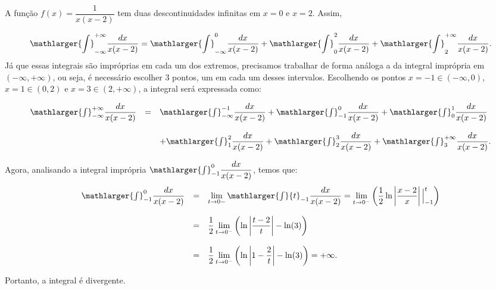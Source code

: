 \cleardoublepage\documentclass[../main.tex]{subfiles}
\begin{document}
\begin{ex}
\begin{compactenum}[a)]
\begin{solution}
A função \(f(x)=\dfrac{1}{x(x-2)}\) tem duas descontinuidades infinitas em \(x=0\) e \(x=2\). Assim,

\[ \mathlarger{\int}^{+\infty}_{-\infty} \dfrac{dx}{x(x-2)}=\mathlarger{\int}^{0}_{-\infty} \dfrac{dx}{x(x-2)} + \mathlarger{\int}^{2}_{0} \dfrac{dx}{x(x-2)} + \mathlarger{\int}^{+\infty}_{2} \dfrac{dx}{x(x-2)}. \]
Já que essas integrais são impróprias em cada um dos extremos, precisamos trabalhar de forma análoga a da integral imprópria em \((-\infty, +\infty)\), ou seja, é necessário escolher 3 pontos, um em cada um desses intervalos. Escolhendo os pontos \(x=-1\in (-\infty, 0)\), \(x=1\in (0,2)\) e \(x=3\in (2, +\infty)\), a integral será expressada como:

\[ \begin{array}{rcl} \mathlarger{\int}^{+\infty}_{-\infty} \dfrac{dx}{x(x-2)}&=&\mathlarger{\int}^{-1}_{-\infty} \dfrac{dx}{x(x-2)} + \mathlarger{\int}^{0}_{-1} \dfrac{dx}{x(x-2)} + \mathlarger{\int}^{1}_{0} \dfrac{dx}{x(x-2)} \\ \\ && + \mathlarger{\int}^{2}_{1} \dfrac{dx}{x(x-2)} + \mathlarger{\int}^{3}_{2} \dfrac{dx}{x(x-2)} + \mathlarger{\int}^{+\infty}_{3} \dfrac{dx}{x(x-2)}. \end{array} \]

Agora, analisando a integral imprópria $\mathlarger{\int}^{0}_{-1} \dfrac{dx}{x(x-2)}$, temos que:
\[ \begin{array}{rcl} \mathlarger{\int}^{0}_{-1} \dfrac{dx}{x(x-2)}& =& \lim\limits_{t \to 0{-}}\mathlarger{\int}{t}_{-1} \dfrac{dx}{x(x-2)} = \lim\limits_{t \to 0^{-}} \left( \dfrac{1}{2} \ln \left|\dfrac{x-2}{x}\right| \Big{|}^{t}_{-1}\right) \\ \\ &=& \dfrac{1}{2}\lim\limits_{t \to 0^{-}} \left( \ln \left|\dfrac{t-2}{t} \right| - \ln (3) \right) \\ \\ &=& \dfrac{1}{2}\lim\limits_{t \to 0^{-}} \left( \ln \left|1- \dfrac{2}{t} \right| - \ln (3) \right) = +\infty. \end{array} \]

Portanto, a integral é divergente.

\end{solution}
\end{compactenum}
\end{ex}
\end{document}
